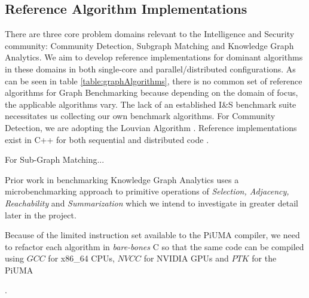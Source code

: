 \documentclass[letterpaper, 10pt]{article}
\begin{document}
\begin{multicols}{2}
{        \subsection{Reference Algorithm Implementations}\label{section:referenceAlgorithms}
        \par{There are three core problem domains relevant to the Intelligence and Security community: Community Detection, Subgraph Matching and Knowledge Graph Analytics. 
        We aim to develop reference implementations for dominant algorithms in these domains in both single-core and parallel/distributed configurations.
        As can be seen in table \ref{table:graphAlgorithms}, there is no common set of reference algorithms for Graph Benchmarking because depending on the domain of focus, the applicable algorithms vary. The lack of an established I\&S benchmark suite necessitates us collecting our own benchmark algorithms. 
        For Community Detection, we are adopting the Louvian Algorithm \cite{Blondel2008}. Reference implementations exist in C++ for both sequential and distributed code \cite{Ghosh2018}. 
        
        For Sub-Graph Matching...

        Prior work in benchmarking Knowledge Graph Analytics uses a microbenchmarking approach to primitive operations of \textit{Selection, Adjacency, Reachability} and \textit{Summarization} \cite{Angles2013} which we intend to investigate in greater detail later in the project. 
        
        Because of the limited instruction set available to the PiUMA compiler, we need to refactor each algorithm in \textit{bare-bones} C so that the same code can be compiled using $GCC$ for x86\_64 CPUs, $NVCC$ for NVIDIA GPUs and $PTK$ for the PiUMA}.

}
\end{multicols}
\end{document}
